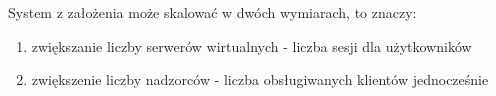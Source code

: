\documentclass[../../deliverable-two.tex]{subfiles}
\begin{document}
System z założenia może skalować w dwóch wymiarach, to znaczy:
\begin{enumerate}
	\item zwiększanie liczby serwerów wirtualnych - liczba sesji dla użytkowników
	\item zwiększenie liczby nadzorców - liczba obsługiwanych klientów jednocześnie
\end{enumerate}
\end{document}
